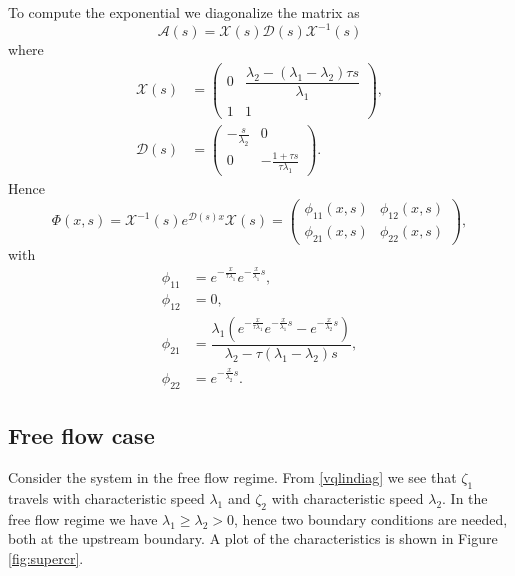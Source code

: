 \documentclass[preprint]{elsarticle}
\begin{document}
To compute the exponential we diagonalize the matrix as 
\begin{equation}
\mathscr{A}(s) = \mathscr{X}(s)\mathscr{D}(s)\mathscr{X}^{-1}(s)
\end{equation} 
where  
\begin{align}
\mathscr{X}(s) &= \begin{pmatrix}
0 & \dfrac{\lambda_2 - (\lambda_1 - \lambda_2) \tau s}{\lambda_1} \\
1 & 1
\end{pmatrix}, \\
\mathscr{D}(s) &= \begin{pmatrix}
-\frac{s}{\lambda_2} & 0 \\
 0 & -\frac{1+\tau s}{\tau \lambda_1}
\end{pmatrix}.
\end{align}
Hence
\begin{equation}
\Phi(x,s) =  \mathscr{X}^{-1}(s)e^{\mathscr{D}(s)x}\mathscr{X}(s) =
\begin{pmatrix}
\phi_{11}(x,s) & \phi_{12}(x,s) \\ 
\phi_{21}(x,s) & \phi_{22}(x,s)
\end{pmatrix},
\end{equation}
with
\begin{subequations} \label{TFv0q0tovxqx}
\begin{align}
\phi_{11} &= e^{-\frac{x}{\tau \lambda_1}}e^{-\frac{x}{\lambda_1}s}, \\ 
\phi_{12} &= 0, \\
\phi_{21} &= \dfrac{\lambda_1 \left( e^{-\frac{x}{\tau \lambda_1}}e^{-\frac{x}{\lambda_1}s} - e^{-\frac{x}{\lambda_2}s}\right)}{\lambda_2 - \tau (\lambda_1 - \lambda_2)s}, \\
\phi_{22} &= e^{-\frac{x}{\lambda_2}s}.
\end{align}
\end{subequations}
\subsection{Free flow case}
Consider the system in the free flow regime. From \eqref{vqlindiag} we see that $\zeta_1$ travels with characteristic speed $\lambda_1$ and $\zeta_2$ with characteristic speed $\lambda_2$. In the free flow regime we have $\lambda_1 \geq \lambda_2 > 0$, hence two boundary conditions are needed, both at the upstream boundary. A plot of the characteristics is shown in Figure \ref{fig:supercr}.
\end{document}
